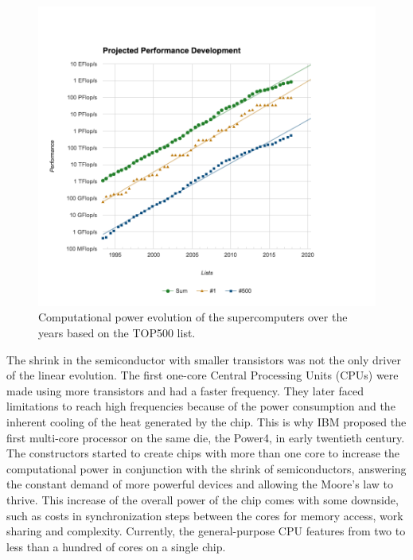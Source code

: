 \begin{figure}
\centering
\includegraphics[width=.85\linewidth]{figures/introduction/top500_list_approximation.png}
\caption{Computational power evolution of the supercomputers over the years based on the TOP500 list.}
\label{fig:intro_top500}
\end{figure}

The shrink in the semiconductor with smaller transistors was not the only driver of the linear evolution.
The first one-core Central Processing Units (CPUs) were made using more transistors and had a faster frequency.
They later faced limitations to reach high frequencies because of the power consumption and the inherent cooling of the heat generated by the chip.
This is why IBM proposed the first multi-core processor on the same die, the Power4, in early twentieth century.
The constructors started to create chips with more than one core to increase the computational power in conjunction with the shrink of semiconductors, answering the constant demand of more powerful devices and allowing the Moore's law to thrive. 
This increase of the overall power of the chip comes with some downside, such as costs in synchronization steps between the cores for memory access, work sharing and complexity.
Currently, the general-purpose CPU features from two to less than a hundred of cores on a single chip.\\

